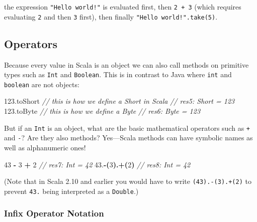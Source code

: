 \documentclass[11pt,a5paper,]{book}
\newenvironment{Shaded}{\begin{snugshade}}{\end{snugshade}}
\newcommand{\CommentTok}[1]{\textcolor[rgb]{0.56,0.35,0.01}{\textit{#1}}}
\newcommand{\DecValTok}[1]{\textcolor[rgb]{0.00,0.00,0.81}{#1}}
\newcommand{\FloatTok}[1]{\textcolor[rgb]{0.00,0.00,0.81}{#1}}
\newcommand{\NormalTok}[1]{#1}
\newcommand{\OperatorTok}[1]{\textcolor[rgb]{0.81,0.36,0.00}{\textbf{#1}}}
\begin{document}
the expression \texttt{"Hello\ world!"} is evaluated first, then
\texttt{2\ +\ 3} (which requires evaluating \texttt{2} and then
\texttt{3} first), then finally \texttt{"Hello\ world!".take(5)}.

\hypertarget{operators}{%
\subsection{Operators}\label{operators}}

Because every value in Scala is an object we can also call methods on
primitive types such as \texttt{Int} and \texttt{Boolean}. This is in
contrast to Java where \texttt{int} and \texttt{boolean} are not
objects:

\begin{Shaded}
\begin{Highlighting}[]
\FloatTok{123.}\NormalTok{toShort }\CommentTok{// this is how we define a \textasciigrave{}Short\textasciigrave{} in Scala}
\CommentTok{// res5: Short = 123}
\FloatTok{123.}\NormalTok{toByte }\CommentTok{// this is how we define a \textasciigrave{}Byte\textasciigrave{}}
\CommentTok{// res6: Byte = 123}
\end{Highlighting}
\end{Shaded}

But if an \texttt{Int} is an object, what are the basic mathematical
operators such as \texttt{+} and \texttt{-}? Are they also methods?
Yes---Scala methods can have symbolic names as well as alphanumeric
ones!

\begin{Shaded}
\begin{Highlighting}[]
\DecValTok{43} \OperatorTok{{-}} \DecValTok{3} \OperatorTok{+} \DecValTok{2}
\CommentTok{// res7: Int = 42}
\FloatTok{43.}\OperatorTok{{-}(}\DecValTok{3}\OperatorTok{).+(}\DecValTok{2}\OperatorTok{)}
\CommentTok{// res8: Int = 42}
\end{Highlighting}
\end{Shaded}

(Note that in Scala 2.10 and earlier you would have to write
\texttt{(43).-(3).+(2)} to prevent \texttt{43.} being interpreted as a
\texttt{Double}.)

\hypertarget{infix-operator-notation}{%
\subsubsection*{Infix Operator Notation}\label{infix-operator-notation}}
\end{document}

